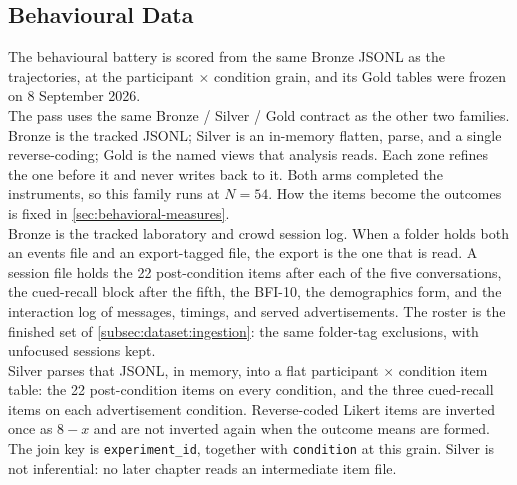 \subsection{Behavioural Data}
\label{subsec:dataset:behavioural}

The behavioural battery is scored from the same Bronze JSONL as the trajectories, at the participant \(\times\) condition grain, and its Gold tables were frozen on 8 September 2026.
\\

The pass uses the same Bronze / Silver / Gold contract as the other two families. Bronze is the tracked JSONL; Silver is an in-memory flatten, parse, and a single reverse-coding; Gold is the named views that analysis reads. Each zone refines the one before it and never writes back to it. Both arms completed the instruments, so this family runs at \(N=54\). How the items become the outcomes is fixed in \autoref{sec:behavioral-measures}.
\\

Bronze is the tracked laboratory and crowd session log.
When a folder holds both an events file and an export-tagged file, the export is the one that is read.
A session file holds the 22 post-condition items after each of the five conversations, the cued-recall block after the fifth, the BFI-10, the demographics form, and the interaction log of messages, timings, and served advertisements.
The roster is the finished set of \autoref{subsec:dataset:ingestion}: the same folder-tag exclusions, with unfocused sessions kept.
\\

Silver parses that JSONL, in memory, into a flat participant \(\times\) condition item table: the 22 post-condition items on every condition, and the three cued-recall items on each advertisement condition.
Reverse-coded Likert items are inverted once as \(8-x\) and are not inverted again when the outcome means are formed.
The join key is \texttt{experiment\_id}, together with \texttt{condition} at this grain.
Silver is not inferential: no later chapter reads an intermediate item file.
\\


